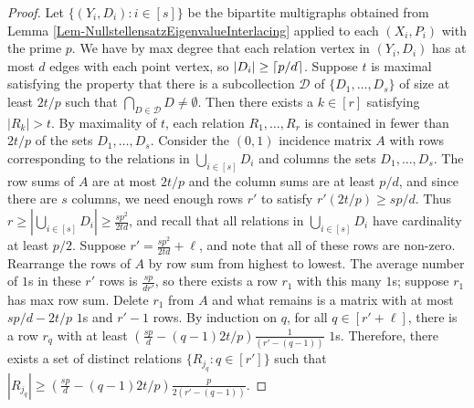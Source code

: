 \documentclass[12pt]{article}
\DeclarePairedDelimiter\ceil{\lceil}{\rceil}
\theoremstyle{definition}
\begin{document}
	\begin{proof}
		Let $\{(Y_i,D_i): i \in [s]\}$ be the bipartite multigraphs obtained from Lemma \ref{Lem-NullstellensatzEigenvalueInterlacing} applied to each $(X_i,P_i)$ with the prime $p$.  We have by max degree that each relation vertex in $(Y_i,D_i)$ has at most $d$ edges with each point vertex, so $|D_i| \geq \ceil{p/d}$.  Suppose $t$ is maximal satisfying the property that there is a subcollection $\mathcal{D}$ of $\{D_1,\ldots, D_s\}$ of size at least $2t/p$ such that $\bigcap_{D \in \mathcal{D}}D \neq \emptyset$.  Then there exists a $k \in [r]$ satisfying $|R_k| > t$.  By maximality of $t$, each relation $R_1, \ldots, R_r$ is contained in fewer than $2t/p$ of the sets $D_1,\ldots, D_s$.  Consider the $(0,1)$ incidence matrix $A$ with rows corresponding to the relations in $\bigcup_{i \in [s]}D_i$ and columns the sets $D_1,\ldots, D_s$.  The row sums of $A$ are at most $2t/p$ and the column sums are at least $p/d$, and since there are $s$ columns, we need enough rows $r'$ to satisfy $r' (2t/p) \geq sp/d$.  Thus $r \geq |\bigcup_{i \in [s]}D_i| \geq \tfrac{sp^2}{2td}$, and recall that all relations in $\bigcup_{i\in[s]}D_i$ have cardinality at least $p/2$.  Suppose $r' = \tfrac{sp^2}{2td} + \ell$, and note that all of these rows are non-zero.  Rearrange the rows of $A$ by row sum from highest to lowest.  The average number of $1$s in these $r'$ rows is $\tfrac{sp}{dr'}$, so there exists a row $r_1$ with this many $1$s; suppose $r_1$ has max row sum.  Delete $r_1$ from $A$ and what remains is a matrix with at most $sp/d - 2t/p$ $1$s and $r'-1$ rows.  By induction on $q$, for all $q \in [r'+\ell]$, there is a row $r_q$ with at least $(\tfrac{sp}{d}-(q-1)2t/p)\tfrac{1}{(r'-(q-1))}$ $1$s.  Therefore, there exists a set of distinct relations $\{R_{j_q}: q \in [r']\}$ such that $|R_{j_q}| \geq (\tfrac{sp}{d}-(q-1)2t/p)\tfrac{p}{2(r'-(q-1))}$. \qedhere
		
		
		
		

\end{proof}
\end{document}
